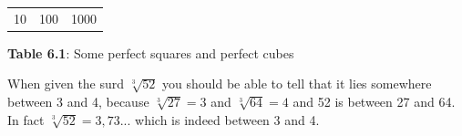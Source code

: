 {\begin{center}
\begin{xtabular*}{\mytablewidth}[t]{|p{10\mystarwidth}|p{10\mystarwidth}|p{10\mystarwidth}|}
        10 &
        100 &
        1000%
     \tabularnewline{}
    \end{xtabular*}
      \end{center}
    \begin{center}{\small\bfseries Table 6.1}: Some perfect squares and perfect cubes\end{center}
        }%
    \par
      \label{m38347*id259412}When given the surd $\sqrt[3]{52}$ you should be able to tell that it lies somewhere between 3 and 4, because $\sqrt[3]{27}=3$ and $\sqrt[3]{64}=4$ and 52 is between 27 and 64. In fact $\sqrt[3]{52}=3,73...$ which is indeed between 3 and 4.\par 
\label{m38347*secfhsst!!!underscore!!!id162}\vspace{.5cm} 
      \noindent
